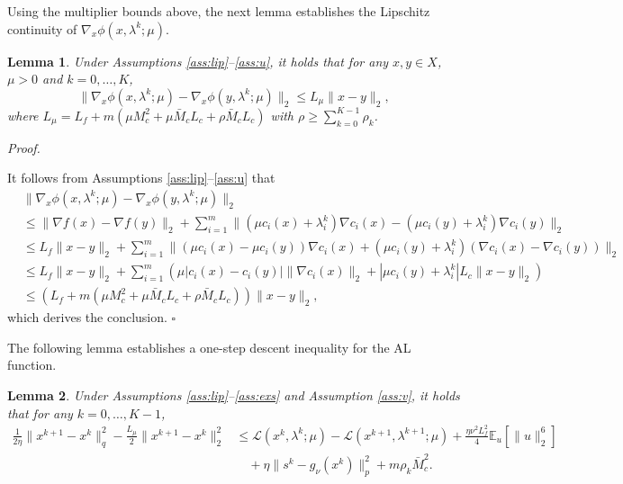 \documentclass[11pt]{article}
\newtheorem{lemma}{Lemma}[section]
\newenvironment{proof}[1][Proof]{%
    \par\noindent\textit{#1.}\enspace
  }{%
    \hfill\ensuremath{\square}\par
  }%
\numberwithin{equation}{section}
\def\red#1{\textcolor{red}{#1}}
\newcommand{\E}{\mathbb{E}}
\newcommand{\bee}{\begin{equation*}}
\newcommand{\eee}{\end{equation*}}
\begin{document}
Using the multiplier bounds above, the next lemma establishes the Lipschitz continuity of $\nabla_x\phi(x,\lambda^k;\mu)$.
\begin{lemma}\label{le:Lu}
    Under Assumptions \ref{ass:lip}--\ref{ass:u},  it holds that for any $x,y \in X $, $\mu>0$ and $k =0,\ldots,K$, 
    \bee
        \lVert \nabla_x {\phi} ( x, \lambda^k;\mu ) - \nabla_x {\phi} ( y, \lambda^k; \mu)  \rVert_2
        \leq L_\mu \lVert x-y \rVert_2 ,
    \eee
where \(L_\mu = L_f + m(\mu M_c^2+\mu \bar{M}_c L_c + \rho \bar{M}_c L_c) \) with \(\rho\geq\sum_{k=0}^{K-1} \rho_k\).
\end{lemma}
\begin{proof}
     It follows from Assumptions \ref{ass:lip}--\ref{ass:u} that
    \bee
    \begin{aligned}
        &\lVert \nabla_x {\phi} ( x, \lambda^k;\mu ) - \nabla_x {\phi} ( y, \lambda^k; \mu)  \rVert_2 \\
        &\leq  \lVert \nabla f(x) - \nabla f(y) \rVert_2 + \sum_{i = 1}^m  \lVert  ( \mu  c_{i} ( x ) +\lambda_i^k ) \nabla c_{i} ( x ) - ( \mu  c_{i} ( y ) +\lambda_i^k )\nabla c_{i} ( y )   \rVert_2 \\
        &\leq   {L_f} \|x-y\|_2+ \sum_{i = 1}^m  \lVert (   \mu  c_{i} ( x )  -  \mu  c_{i} ( y ) ) \nabla c_{i} ( x ) + ( \mu  c_{i} ( y ) +\lambda_i^k )  ( \nabla c_i ( x ) -\nabla c_i ( y )  )   \rVert_2 \\
        &\leq   {L_f} \|x-y\|_2+ \sum_{i = 1}^m  (  \mu \lvert c_{i} ( x ) -c_{i} ( y )  \rvert \lVert \nabla c_{i} ( x )  \rVert_2+ | \mu  c_{i} ( y ) +\lambda_{i}^k | L_c\lVert x-y\rVert_2  )\\
        &\leq   ({L_f} + m(\mu M_c^2+\mu \bar{M}_c L_c + \rho \bar M_c L_c)) \|x-y\|_2,
    \end{aligned}
    \eee
    which derives the conclusion.
\end{proof}
The following lemma establishes a one-step descent inequality for the AL function.
\begin{lemma}\label{le:x} 
     Under Assumptions \ref{ass:lip}--\ref{ass:exs} and Assumption \ref{ass:v}, 
     it holds that for any \(k=0,\ldots,K-1\),
    \bee
    \begin{aligned}
    \frac{1}{2\eta}\|x^{k+1}-x^k\|_q^2-\frac{L_\mu}{2}\|x^{k+1}-x^k\|_2^2 &\leq \mathcal{L}(x^k,\lambda^k;\mu)-\mathcal{L}(x^{k+1},\lambda^{k+1};\mu) + \frac{\eta \nu^2 L_f^2}{4}\E_u[\|u\|_2^6] \\
    &\quad + \eta \|s^k - g_\nu (x^k)\|_p^2 + m \rho_k \bar{M}_c^2.
    \end{aligned}
    \eee
\end{lemma}
\end{document}
